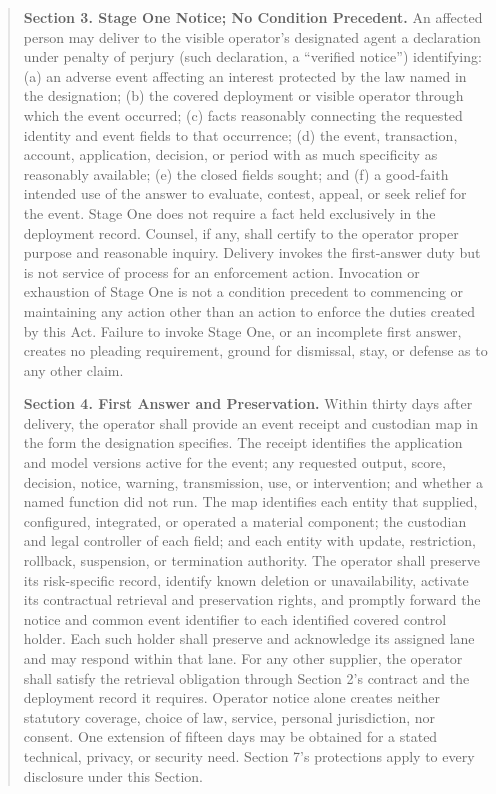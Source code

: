 \begin{quote}
\textbf{Section 3. Stage One Notice; No Condition Precedent.} An affected person may deliver to the visible operator's designated agent a declaration under penalty of perjury (such declaration, a ``verified notice'') identifying: (a) an adverse event affecting an interest protected by the law named in the designation; (b) the covered deployment or visible operator through which the event occurred; (c) facts reasonably connecting the requested identity and event fields to that occurrence; (d) the event, transaction, account, application, decision, or period with as much specificity as reasonably available; (e) the closed fields sought; and (f) a good-faith intended use of the answer to evaluate, contest, appeal, or seek relief for the event. Stage One does not require a fact held exclusively in the deployment record. Counsel, if any, shall certify to the operator proper purpose and reasonable inquiry. Delivery invokes the first-answer duty but is not service of process for an enforcement action. Invocation or exhaustion of Stage One is not a condition precedent to commencing or maintaining any action other than an action to enforce the duties created by this Act. Failure to invoke Stage One, or an incomplete first answer, creates no pleading requirement, ground for dismissal, stay, or defense as to any other claim.

\textbf{Section 4. First Answer and Preservation.} Within thirty days after delivery, the operator shall provide an event receipt and custodian map in the form the designation specifies. The receipt identifies the application and model versions active for the event; any requested output, score, decision, notice, warning, transmission, use, or intervention; and whether a named function did not run. The map identifies each entity that supplied, configured, integrated, or operated a material component; the custodian and legal controller of each field; and each entity with update, restriction, rollback, suspension, or termination authority. The operator shall preserve its risk-specific record, identify known deletion or unavailability, activate its contractual retrieval and preservation rights, and promptly forward the notice and common event identifier to each identified covered control holder. Each such holder shall preserve and acknowledge its assigned lane and may respond within that lane. For any other supplier, the operator shall satisfy the retrieval obligation through Section 2's contract and the deployment record it requires. Operator notice alone creates neither statutory coverage, choice of law, service, personal jurisdiction, nor consent. One extension of fifteen days may be obtained for a stated technical, privacy, or security need. Section 7's protections apply to every disclosure under this Section.


\end{quote}

